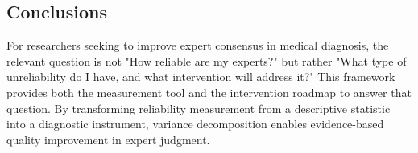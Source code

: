 \subsection*{Conclusions}

For researchers seeking to improve expert consensus in medical diagnosis, the relevant question is not "How reliable are my experts?" but rather "What type of unreliability do I have, and what intervention will address it?" This framework provides both the measurement tool and the intervention roadmap to answer that question. By transforming reliability measurement from a descriptive statistic into a diagnostic instrument, variance decomposition enables evidence-based quality improvement in expert judgment.
